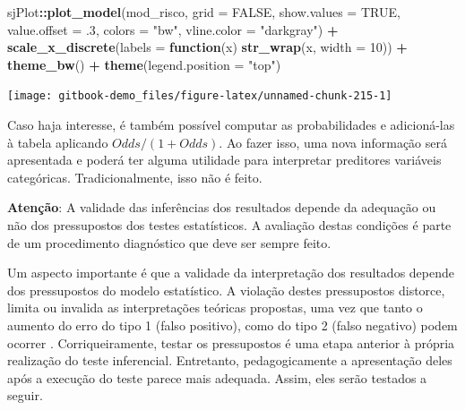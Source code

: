 \documentclass[
]{book}
\newenvironment{Shaded}{\begin{snugshade}}{\end{snugshade}}
\newcommand{\ControlFlowTok}[1]{\textcolor[rgb]{0.13,0.29,0.53}{\textbf{#1}}}
\newcommand{\DataTypeTok}[1]{\textcolor[rgb]{0.13,0.29,0.53}{#1}}
\newcommand{\DecValTok}[1]{\textcolor[rgb]{0.00,0.00,0.81}{#1}}
\newcommand{\FloatTok}[1]{\textcolor[rgb]{0.00,0.00,0.81}{#1}}
\newcommand{\KeywordTok}[1]{\textcolor[rgb]{0.13,0.29,0.53}{\textbf{#1}}}
\newcommand{\NormalTok}[1]{#1}
\newcommand{\OperatorTok}[1]{\textcolor[rgb]{0.81,0.36,0.00}{\textbf{#1}}}
\newcommand{\OtherTok}[1]{\textcolor[rgb]{0.56,0.35,0.01}{#1}}
\newcommand{\StringTok}[1]{\textcolor[rgb]{0.31,0.60,0.02}{#1}}
\begin{document}
\begin{Shaded}
\begin{Highlighting}[]
\NormalTok{sjPlot}\OperatorTok{::}\KeywordTok{plot_model}\NormalTok{(mod_risco,}
            \DataTypeTok{grid =} \OtherTok{FALSE}\NormalTok{, }
            \DataTypeTok{show.values =} \OtherTok{TRUE}\NormalTok{, }\DataTypeTok{value.offset =} \FloatTok{.3}\NormalTok{, }
            \DataTypeTok{colors =} \StringTok{"bw"}\NormalTok{,}
            \DataTypeTok{vline.color =} \StringTok{"darkgray"}\NormalTok{) }\OperatorTok{+}
\StringTok{  }\KeywordTok{scale_x_discrete}\NormalTok{(}\DataTypeTok{labels =} \ControlFlowTok{function}\NormalTok{(x) }\KeywordTok{str_wrap}\NormalTok{(x, }\DataTypeTok{width =} \DecValTok{10}\NormalTok{)) }\OperatorTok{+}
\StringTok{  }\KeywordTok{theme_bw}\NormalTok{() }\OperatorTok{+}
\StringTok{  }\KeywordTok{theme}\NormalTok{(}\DataTypeTok{legend.position =} \StringTok{"top"}\NormalTok{)}
\end{Highlighting}
\end{Shaded}

\begin{center}\texttt{[image: gitbook-demo\_files/figure-latex/unnamed-chunk-215-1]} \end{center}

Caso haja interesse, é também possível computar as probabilidades e adicioná-las à tabela aplicando \(Odds/(1+Odds)\). Ao fazer isso, uma nova informação será apresentada e poderá ter alguma utilidade para interpretar preditores variáveis categóricas. Tradicionalmente, isso não é feito.

\begin{warning}

\textbf{Atenção}: A validade das inferências dos resultados depende da adequação ou não dos pressupostos dos testes estatísticos. A avaliação destas condições é parte de um procedimento diagnóstico que deve ser sempre feito.

\end{warning}

Um aspecto importante é que a validade da interpretação dos resultados depende dos pressupostos do modelo estatístico. A violação destes pressupostos distorce, limita ou invalida as interpretações teóricas propostas, uma vez que tanto o aumento do erro do tipo 1 (falso positivo), como do tipo 2 (falso negativo) podem ocorrer \citep{Lix1996, Barker2015, Ernst2017}. Corriqueiramente, testar os pressupostos é uma etapa anterior à própria realização do teste inferencial. Entretanto, pedagogicamente a apresentação deles após a execução do teste parece mais adequada. Assim, eles serão testados a seguir.
\end{document}
